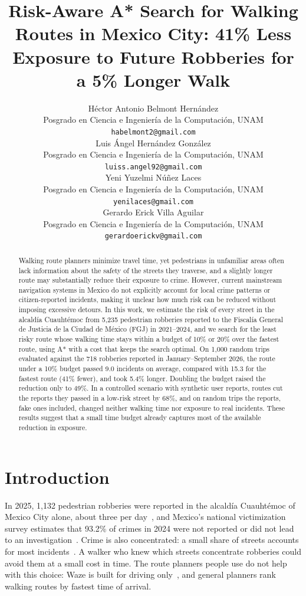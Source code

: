 \documentclass{article}
\title{Risk-Aware A* Search for Walking Routes in Mexico City: 41\% Less Exposure to Future Robberies for a 5\% Longer Walk}
\author{%
  Héctor Antonio Belmont Hernández \\
  Posgrado en Ciencia e Ingeniería de la Computación, UNAM \\
  \texttt{habelmont2@gmail.com} \\
  \And
  Luis Ángel Hernández González \\
  Posgrado en Ciencia e Ingeniería de la Computación, UNAM \\
  \texttt{luiss.angel92@gmail.com} \\
  \And
  Yeni Yuzelmi Núñez Laces \\
  Posgrado en Ciencia e Ingeniería de la Computación, UNAM \\
  \texttt{yenilaces@gmail.com} \\
  \And
  Gerardo Erick Villa Aguilar \\
  Posgrado en Ciencia e Ingeniería de la Computación, UNAM \\
  \texttt{gerardoerickv@gmail.com} \\
}
\begin{document}
\maketitle

\begin{abstract}
 Walking route planners minimize travel time, yet pedestrians in unfamiliar areas often lack information about the safety of the streets they traverse, and a slightly longer route may substantially reduce their exposure to crime. However, current mainstream navigation systems in Mexico do not explicitly account for local crime patterns or citizen-reported incidents, making it unclear how much risk can be reduced without imposing excessive detours.
 In this work, we estimate the risk of every street in the alcaldía Cuauhtémoc from 5,235 pedestrian robberies reported to the Fiscalía General de Justicia de la Ciudad de México (FGJ) in 2021--2024, and we search for the least risky route whose walking time stays within a budget of 10\% or 20\% over the fastest route, using A* with a cost that keeps the search optimal. On 1,000 random trips evaluated against the 718 robberies reported in January--September 2026, the route under a 10\% budget passed 9.0 incidents on average, compared with 15.3 for the fastest route (41\% fewer), and took 5.4\% longer. Doubling the budget raised the reduction only to 49\%. In a controlled scenario with synthetic user reports, routes cut the reports they passed in a low-risk street by 68\%, and on random trips the reports, fake ones included, changed neither walking time nor exposure to real incidents. These results suggest that a small
  time budget already captures most of the available reduction in exposure.
\end{abstract}

\section{Introduction}

In 2025, 1,132 pedestrian robberies were reported in the alcaldía Cuauhtémoc
of Mexico City alone, about three per day~\cite{hoyodecrimen}, and Mexico's
national victimization survey estimates that 93.2\% of crimes in 2024 were not reported or did not
lead to an investigation~\cite{inegi2025envipe}. Crime is also concentrated: a small share of
streets accounts for most incidents~\cite{weisburd2015law}. A walker who knew which streets
concentrate robberies could avoid them at a small cost in time. The route planners people use do not
help with this choice: Waze is built for driving only~\cite{waze2023footpaths}, and general
planners rank walking routes by fastest time of arrival.
\end{document}

